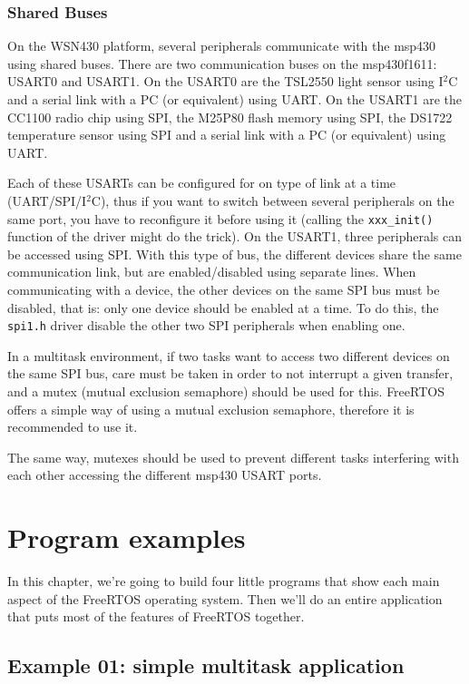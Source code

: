 \documentclass[11pt]{report}
\begin{document}
\subsection{Shared Buses}
On the WSN430 platform, several peripherals communicate with the msp430 using shared buses. There are two communication buses on the msp430f1611: USART0 and USART1. On the USART0 are the TSL2550 light sensor using I$^2$C and a serial link with a PC (or equivalent) using UART. On the USART1 are the CC1100 radio chip using SPI, the M25P80 flash memory using SPI, the DS1722 temperature sensor using SPI and a serial link with a PC (or equivalent) using UART.

Each of these USARTs can be configured for on type of link at a time (UART/SPI/I$^2$C), thus if you want to switch between several peripherals on the same port, you have to reconfigure it before using it (calling the \verb$xxx_init()$ function of the driver might do the trick). On the USART1, three peripherals can be accessed using SPI. With this type of bus, the different devices share the same communication link, but are enabled/disabled using separate lines. When communicating with a device, the other devices on the same SPI bus must be disabled, that is: only one device should be enabled at a time. To do this, the \verb$spi1.h$ driver disable the other two SPI peripherals when enabling one.

In a multitask environment, if two tasks want to access two different devices on the same SPI bus, care must be taken in order to not interrupt a given transfer, and a mutex (mutual exclusion semaphore) should be used for this. FreeRTOS offers a simple way of using a mutual exclusion semaphore, therefore it is recommended to use it.

The same way, mutexes should be used to prevent different tasks interfering with each other accessing the different msp430 USART ports.


\chapter{Program examples}

In this chapter, we're going to build four little programs that show each main aspect of the FreeRTOS operating system. Then we'll do an entire application that puts most of the features of FreeRTOS together.

\section{Example 01: simple multitask application}
\end{document}
